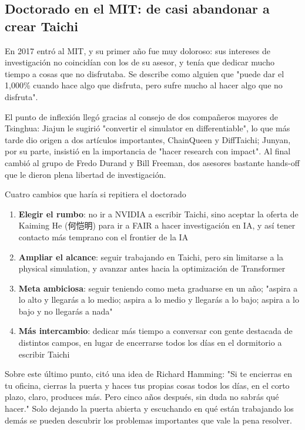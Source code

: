 \subsection{Doctorado en el MIT: de casi abandonar a crear Taichi}

En 2017 entró al MIT, y su primer año fue muy doloroso: sus intereses de investigación no coincidían con los de su asesor, y tenía que dedicar mucho tiempo a cosas que no disfrutaba. Se describe como alguien que "puede dar el 1,000\% cuando hace algo que disfruta, pero sufre mucho al hacer algo que no disfruta".

El punto de inflexión llegó gracias al consejo de dos compañeros mayores de Tsinghua: Jiajun le sugirió "convertir el simulator en differentiable", lo que más tarde dio origen a dos artículos importantes, ChainQueen y DiffTaichi; Junyan, por su parte, insistió en la importancia de "hacer research con impact". Al final cambió al grupo de Fredo Durand y Bill Freeman, dos asesores bastante hands-off que le dieron plena libertad de investigación.

\begin{importantbox}{Cuatro cambios que haría si repitiera el doctorado}
\begin{enumerate}
\item \textbf{Elegir el rumbo}: no ir a NVIDIA a escribir Taichi, sino aceptar la oferta de Kaiming He (何恺明) para ir a FAIR a hacer investigación en IA, y así tener contacto más temprano con el frontier de la IA
\item \textbf{Ampliar el alcance}: seguir trabajando en Taichi, pero sin limitarse a la physical simulation, y avanzar antes hacia la optimización de Transformer
\item \textbf{Meta ambiciosa}: seguir teniendo como meta graduarse en un año; "aspira a lo alto y llegarás a lo medio; aspira a lo medio y llegarás a lo bajo; aspira a lo bajo y no llegarás a nada"
\item \textbf{Más intercambio}: dedicar más tiempo a conversar con gente destacada de distintos campos, en lugar de encerrarse todos los días en el dormitorio a escribir Taichi
\end{enumerate}
\end{importantbox}

Sobre este último punto, citó una idea de Richard Hamming: "Si te encierras en tu oficina, cierras la puerta y haces tus propias cosas todos los días, en el corto plazo, claro, produces más. Pero cinco años después, sin duda no sabrás qué hacer." Solo dejando la puerta abierta y escuchando en qué están trabajando los demás se pueden descubrir los problemas importantes que vale la pena resolver.


